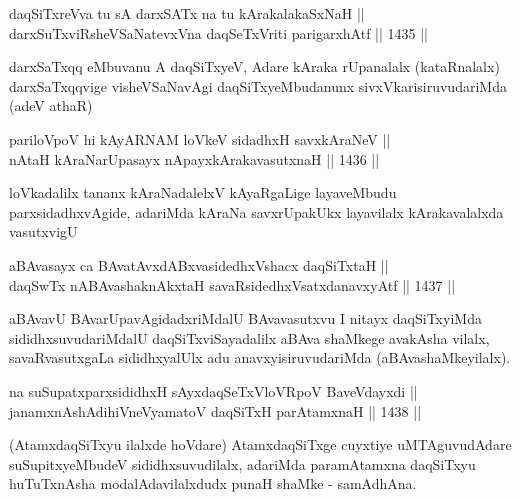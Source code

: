 
\begin{shl}
daqSiTxreVva tu sA darxSATx na tu kArakalakaSxNaH || \\
darxSuTxviRsheVSaNatevxVna daqSeTxVriti parigarxhAtf ||  1435 ||  
\end{shl}

\begin{artha}
darxSaTxqq eMbuvanu A daqSiTxyeV, Adare kAraka rUpanalalx (kataRnalalx) darxSaTxqqvige visheVSaNavAgi daqSiTxyeMbudanunx sivxVkarisiruvudariMda (adeV athaR)
\end{artha}


\begin{shl}
pariloVpoV hi kAyARNAM loVkeV sidadhxH savxkAraNeV || \\
nAtaH kAraNarUpasayx nApayxkArakavasutxnaH ||  1436 ||  
\end{shl}

\begin{artha}
loVkadalilx tananx kAraNadalelxV kAyaRgaLige layaveMbudu parxsidadhxvAgide, adariMda kAraNa savxrUpakUkx layavilalx kArakavalalxda vasutxvigU
\end{artha}


\begin{shl}
aBAvasayx ca BAvatAvxdABxvasidedhxVshacx daqSiTxtaH || \\
daqSwTx nABAvashaknAkx\s taH savaRsidedhxVsatxdanavxyAtf ||  1437 ||  
\end{shl}

\begin{artha}
aBAvavU BAvarUpavAgidadxriMdalU BAvavasutxvu I nitayx daqSiTxyiMda sididhxsuvudariMdalU daqSiTxviSayadalilx aBAva shaMkege avakAsha vilalx, savaRvasutxgaLa sididhxyalUlx adu anavxyisiruvudariMda (aBAvashaMkeyilalx).
\end{artha}


\begin{shl}
na suSupatxparxsididhxH sAyxdaqSeTxVloVRpoV BaveVdayxdi || \\
janamxnAshAdihiVneVyamatoV daqSiTxH parAtamxnaH ||  1438 ||  
\end{shl}

\begin{artha}
(AtamxdaqSiTxyu ilalxde hoVdare) AtamxdaqSiTxge cuyxtiye uMTAguvudAdare suSupitxyeMbudeV sididhxsuvudilalx, adariMda paramAtamxna daqSiTxyu huTuTxnAsha modalAdavilalxdudx punaH shaMke - samAdhAna.
\end{artha}

